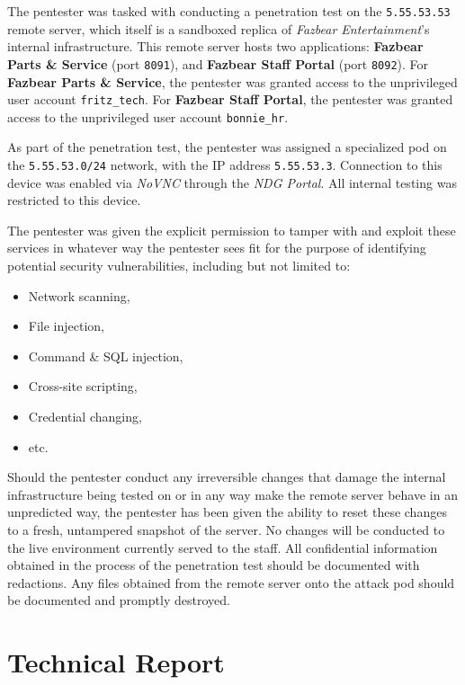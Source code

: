 \documentclass[12pt, letterpaper]{article}
\begin{document}
The pentester was tasked with conducting a penetration test on the
\texttt{5.55.53.53} remote server, which itself is a sandboxed
replica of \textit{Fazbear Entertainment}'s internal infrastructure.
This remote server hosts two applications: \textbf{Fazbear Parts \&
Service} (port \texttt{8091}), and \textbf{Fazbear Staff Portal}
(port \texttt{8092}). \bigskip For \textbf{Fazbear Parts \& Service},
the pentester was granted access to the unprivileged user account
\texttt{fritz\_tech}. For \textbf{Fazbear Staff Portal}, the
pentester was granted access to the unprivileged user account
\texttt{bonnie\_hr}.

As part of the penetration test, the pentester was assigned a
specialized pod on the \texttt{5.55.53.0/24} network, with the IP
address \texttt{5.55.53.3}. Connection to this device was enabled via
\textit{NoVNC} through the \textit{NDG Portal}. All internal testing
was restricted to this device. \bigskip

The pentester was given the explicit permission to tamper with and exploit these
services in whatever way the pentester sees fit for the purpose of identifying
potential security vulnerabilities, including but not limited to:

\begin{itemize}
  \item Network scanning,
  \item File injection,
  \item Command \& SQL injection,
  \item Cross-site scripting,
  \item Credential changing,
  \item etc.
\end{itemize}

Should the pentester conduct any irreversible changes that damage the
internal infrastructure being tested on or in any way make the remote
server behave in an unpredicted way, the pentester has been given the
ability to reset these changes to a fresh, untampered snapshot of the
server. No changes will be conducted to the live environment
currently served to the staff. All confidential information obtained
in the process of the penetration test should be documented with
redactions. Any files obtained from the remote server onto the attack
pod should be documented and promptly destroyed.

\section{Technical Report}
\end{document}
